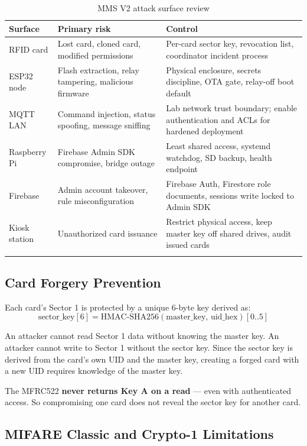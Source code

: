 \begin{longtable}{L{3.5cm}L{5cm}L{5.5cm}}
\toprule
\textbf{Surface} & \textbf{Primary risk} & \textbf{Control} \\
\midrule
\endhead
RFID card & Lost card, cloned card, modified permissions & Per-card sector key, revocation list, coordinator incident process \\
ESP32 node & Flash extraction, relay tampering, malicious firmware & Physical enclosure, secrets discipline, OTA gate, relay-off boot default \\
MQTT LAN & Command injection, status spoofing, message sniffing & Lab network trust boundary; enable authentication and ACLs for hardened deployment \\
Raspberry Pi & Firebase Admin SDK compromise, bridge outage & Least shared access, systemd watchdog, SD backup, health endpoint \\
Firebase & Admin account takeover, rule misconfiguration & Firebase Auth, Firestore role documents, sessions write locked to Admin SDK \\
Kiosk station & Unauthorized card issuance & Restrict physical access, keep master key off shared drives, audit issued cards \\
\bottomrule
\caption{MMS V2 attack surface review}
\label{tab:attack_surface}
\end{longtable}

\subsection{Card Forgery Prevention}

Each card's Sector 1 is protected by a unique 6-byte key derived as:
\[
\text{sector\_key}[6] = \text{HMAC-SHA256}(\text{master\_key},\, \text{uid\_hex})[0..5]
\]

An attacker cannot read Sector 1 data without knowing the master key. An attacker cannot write to Sector 1 without the sector key. Since the sector key is derived from the card's own UID and the master key, creating a forged card with a new UID requires knowledge of the master key.

The MFRC522 \textbf{never returns Key A on a read} --- even with authenticated access. So compromising one card does not reveal the sector key for another card.

\subsection{MIFARE Classic and Crypto-1 Limitations}

